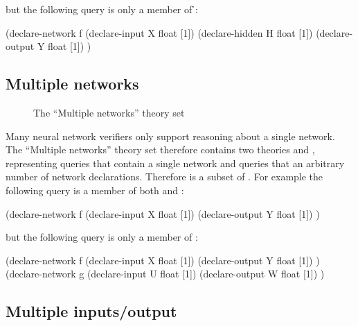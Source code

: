 but the following query is only a member of \h{}:

\begin{code}[style=lbnf]
(declare-network f
    (declare-input  X float [1])
    (declare-hidden H float [1])
    (declare-output Y float [1])
)
\end{code}

\subsection{Multiple networks}
\label{sec:multiple-networks}

\begin{figure}[h]
\centering
{}
\caption{The ``Multiple networks'' theory set}
\label{fig:multiple-networks-theory-set}
\end{figure}

Many neural network verifiers only support reasoning about a single network. The ``Multiple networks'' theory set therefore contains two theories \snet{} and \mnet{}, representing queries that contain a single network and queries that an arbitrary number of network declarations. Therefore \snet{} is a subset of \mnet{}. For example the following query is a member of both \snet{} and \mnet{}:

\begin{code}[style=lbnf]
(declare-network f
    (declare-input  X float [1])
    (declare-output Y float [1])
)
\end{code}

but the following query is only a member of \mnet{}:

\begin{code}[style=lbnf]
(declare-network f
    (declare-input  X float [1])
    (declare-output Y float [1])
)
(declare-network g
    (declare-input  U float [1])
    (declare-output W float [1])
)
\end{code}

\subsection{Multiple inputs/output}
\label{sec:multiple-inputs-outputs}

